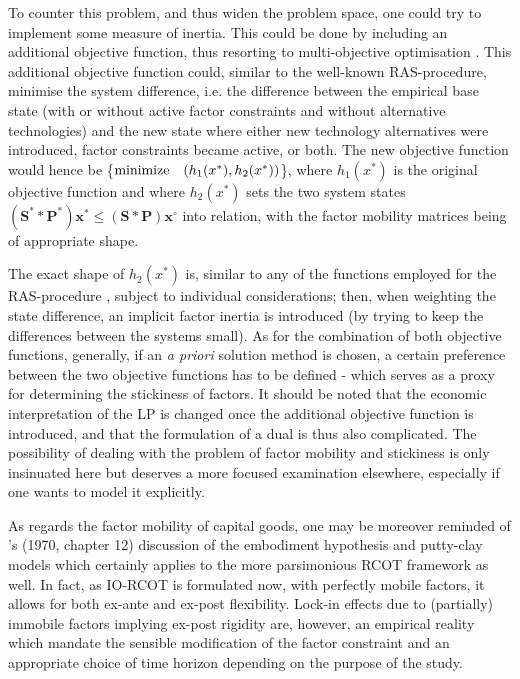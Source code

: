 \documentclass{article}
\begin{document}
\begin{refsection}
To counter this problem, and thus widen the problem space, one could try to implement some measure of inertia. This could be done by including an additional objective function, thus resorting to multi-objective optimisation \parencite[for a review of multi-objective LP in IO, see ][]{oliveira_2014}. This additional objective function could, similar to the well-known RAS-procedure, minimise the system difference, i.e. the difference between the empirical base state (with or without active factor constraints and without alternative technologies) and the new state where either new technology alternatives were introduced, factor constraints became active, or both. The new objective function would hence be \{$ {\rm minimize} \quad (h_{1}(x^{*}), h_{2}(x^{*}))$\}, where $h_{1}(x^{*})$ is the original objective function and where $h_{2}(x^{*})$ sets the two system states $(\bm{S}^{*} \ast \bm{P}^{*}) \bm{x}^{*} \le (\bm{S} \ast \bm{P}) \bm{x}^{\circ}$ into relation, with the factor mobility matrices being of appropriate shape.

The exact shape of $h_{2}(x^{*})$ is, similar to any of the functions employed for the RAS-procedure \parencite{jackson_2004}, subject to individual considerations; then, when weighting the state difference, an implicit factor inertia is introduced (by trying to keep the differences between the systems small). As for the combination of both objective functions, generally, if an \textit{a priori} solution method is chosen, a certain preference between the two objective functions has to be defined - which serves as a proxy for determining the stickiness of factors. It should be noted that the economic interpretation of the LP is changed once the additional objective function is introduced, and that the formulation of a dual is thus also complicated. The possibility of dealing with the problem of factor mobility and stickiness is only insinuated here but deserves a more focused examination elsewhere, especially if one wants to model it explicitly.

As regards the factor mobility of capital goods, one may be moreover reminded of \citeauthor{carter1970}'s (1970, chapter 12) discussion of the embodiment hypothesis and putty-clay models which certainly applies to the more parsimonious RCOT framework as well. In fact, as IO-RCOT is formulated now, with perfectly mobile factors, it allows for both ex-ante and ex-post flexibility. Lock-in effects due to (partially) immobile factors implying ex-post rigidity are, however, an empirical reality which mandate the sensible modification of the factor constraint and an appropriate choice of time horizon depending on the purpose of the study.


\end{refsection}
\end{document}
